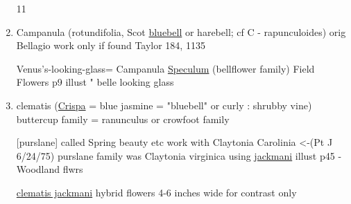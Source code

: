 \documentclass[a4paper,9pt]{article}
\begin{document}
\begin{enumerate}
\color{blue}11
\color{black}
\item Campanula (rotundifolia, Scot \ul{bluebell}
 or harebell; cf C - rapunculoides)
\color{red}
orig 
Bellagio
work only if found
\color{blue}
Taylor
184, 1135 

Venus's-looking-glass= Campanula \ul{Speculum} (bellflower family)
\color{red}
Field Flowers p9 illust " belle looking glass
\color{black}
\item clematis (\ul{Crispa} \color{blue}= \color{black} blue jasmine \color{blue}= \color{black} "bluebell"
or curly : shrubby vine)
\color{blue}
buttercup 
family \color{red}= ranunculus or crowfoot family

[purslane]
\color{red}
called Spring 
beauty etc
work with Claytonia Carolinia <-(Pt J 6/24/75)
\tiny
\color{blue}purslane family
\normalsize
\color{red}
was Claytonia virginica using \ul{jackmani}
illust p45 - Woodland flwrs

\ul{clematis jackmani}
hybrid flowers
4-6 inches wide
for contrast only
\end{enumerate}
\end{document}
